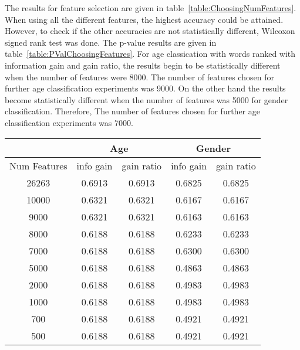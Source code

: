 \documentclass[a4paper]{llncs}
\begin{document}
The results for feature selection are given in table~\ref{table:ChoosingNumFeatures}. When using all the different features, the highest accuracy could be attained. However, to check if the other accuracies are not statistically different, Wilcoxon signed rank test was done. The p-value results are given in table~\ref{table:PValChoosingFeatures}. For age classication with words ranked with information gain and gain ratio, the results begin to be statistically different when the number of features were 8000. The number of features chosen for further age classification experiments was 9000. On the other hand the results become statistically different when the number of features was 5000 for gender classification. Therefore, The number of features chosen for further age classification experiments was 7000. 
\begin{table}[!htbp]
\centering
\begin{tabular}{|c|c|c|c|c|}
\hline
                                   & \multicolumn{2}{c|}{Age} & \multicolumn{2}{c|}{Gender} \\ \hline
\multicolumn{1}{|l|}{Num Features} & info gain  & gain ratio  & info gain    & gain ratio   \\ \hline
26263                              & 0.6913     & 0.6913      & 0.6825       & 0.6825       \\ \hline
10000                              & 0.6321     & 0.6321      & 0.6167       & 0.6167       \\ \hline
9000                               & 0.6321     & 0.6321      & 0.6163       & 0.6163       \\ \hline
8000                               & 0.6188     & 0.6188      & 0.6233       & 0.6233       \\ \hline
7000                               & 0.6188     & 0.6188      & 0.6300       & 0.6300       \\ \hline
5000                               & 0.6188     & 0.6188      & 0.4863       & 0.4863       \\ \hline
2000                               & 0.6188     & 0.6188      & 0.4983       & 0.4983       \\ \hline
1000                               & 0.6188     & 0.6188      & 0.4983       & 0.4983       \\ \hline
700                                & 0.6188     & 0.6188      & 0.4921       & 0.4921       \\ \hline
500                                & 0.6188     & 0.6188      & 0.4921       & 0.4921       \\ \hline

\end{tabular}
\end{table}
\end{document}
